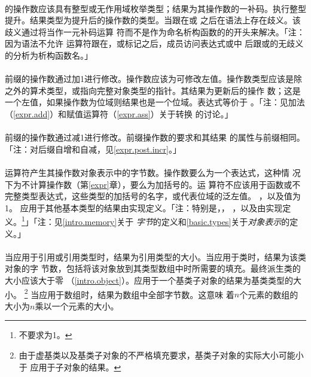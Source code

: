 \paragraph{}
\tm{\~}的操作数应该具有整型或无作用域枚举类型；结果为其操作数的一补码。执行整型
提升。结果类型为提升后的操作数的类型。当\tm{\~}跟在或
之后在语法上存在歧义。该歧义通过将\tm{\~}当作一元补码运算
符而不是作为命名析构函数的的开头来解决。「注：因为语法不允许
运算符跟在，\tm{->}或\tm{::}标记之后，成员访问表达式或中
后跟或的\tm{\~}无歧义的分析为析构函数名。」

\paragraph{}
前缀\tm{++}的操作数通过加1进行修改。操作数应该为可修改左值。操作数类型应该是除
 之外的算术类型，或指向完整对象类型的指针。其结果为更新后的操作
数；这是一个左值，如果操作数为位域则结果也是一个位域。表达式等价于
。「注：见加法（\ref{expr.add}）和赋值运算符（\ref{expr.ass}）关于转换
的讨论。」

\paragraph{}
前缀\tm{\dsh\dsh}的操作数通过减1进行修改。前缀\tm{\dsh\dsh}操作数的要求和其结果
的属性与前缀\tm{++}相同。「注：对后缀自增和自减，见\ref{expr.post.incr}。」

\paragraph{}
运算符产生其操作数对象表示中的字节数。操作数要么为一个表达式，这种情
况下为不计算操作数（第\ref{expr}章），要么为加括号的。运
算符不应该用于函数或不完整类型表达式，这些类型的加括号的名字，或代表位域的泛左值。
，以及值为1。
应用于其他基本类型的结果由实现定义。「注：特别是，，
，以及由实现定
义。\footnote{不要求为1。}」「注：见\ref{intro.memory}关于
\textit{字节}的定义和\ref{basic.types}关于\textit{对象表示}的定义。」

\paragraph{}
当应用于引用或引用类型时，结果为引用类型的大小。当应用于类时，结果为该类对象的字
节数，包括将该对象放到其类型数组中时所需要的填充。最终派生类的大小应该大于零
（\ref{intro.object}）。应用于一个基类子对象的结果为基类类型的大小。
\footnote{由于虚基类以及基类子对象的不严格填充要求，基类子对象的实际大小可能小于
应用于子对象的结果。} 当应用于数组时，结果为数组中全部字节数。这意味
着$n$个元素的数组的大小为$n$乘以一个元素的大小。

